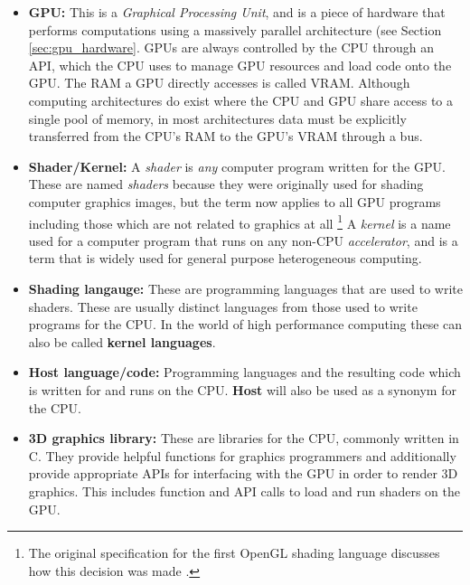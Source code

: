 \documentclass[a4paper,12pt,twoside,openright]{report}
\begin{document}
\begin{itemize}

    \item \textbf{GPU:} This is a \textit{Graphical Processing Unit}, and is a
    piece of hardware that performs computations using a massively parallel
    architecture (see Section \ref{sec:gpu_hardware}. GPUs are always
    controlled by the CPU through an API, which the CPU uses to manage GPU
    resources and load code onto the GPU. The RAM a GPU directly accesses is
    called VRAM. Although computing architectures do exist where the CPU and
    GPU share access to a single pool of memory, in most architectures data
    must be explicitly transferred from the CPU's RAM to the GPU's VRAM through
    a bus.

    \item \textbf{Shader/Kernel:} A \textit{shader} is \textit{any} computer
    program written for the GPU. These are named \textit{shaders} because they
    were originally used for shading computer graphics images, but the term now
    applies to all GPU programs including those which are not related to
    graphics at all \footnote{The original specification for the first OpenGL
    shading language discusses how this decision was made \cite{GLSL_1_10}.} A
    \textit{kernel} is a name used for a computer program that runs on any
    non-CPU \textit{accelerator}, and is a term that is widely used for general
    purpose heterogeneous computing.

    \item \textbf{Shading langauge:} These are programming languages that are
    used to write shaders. These are usually distinct languages from those used
    to write programs for the CPU. In the world of high performance computing
    these can also be called \textbf{kernel languages}.

    \item \textbf{Host language/code:} Programming languages and the resulting
    code which is written for and runs on the CPU. \textbf{Host} will also be
    used as a synonym for the CPU.

    \item \textbf{3D graphics library:} These are libraries for the CPU,
    commonly written in C. They provide helpful functions for graphics
    programmers and additionally provide appropriate APIs for interfacing with
    the GPU in order to render 3D graphics. This includes function and API
    calls to load and run shaders on the GPU.


\end{itemize}
\end{document}
